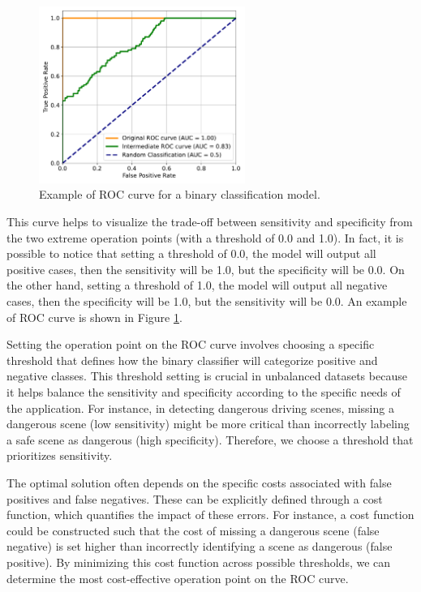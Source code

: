 \begin{figure}
    \centering
    \includegraphics[width=0.6\textwidth]{images/roc/roc_curve.pdf}
    \caption{Example of ROC curve for a binary classification model.}
    \label{fig:roc_curve}
\end{figure}
This curve helps to 
visualize the trade-off between sensitivity and specificity from the two extreme 
operation points (with a threshold of 0.0 and 1.0).
In fact, it is possible to notice that setting a threshold of 0.0, the model 
will output all positive cases, then the sensitivity will be 1.0, but the 
specificity will be 0.0. On the other hand, setting a threshold of 1.0, the model 
will output all negative cases, then the specificity will be 1.0, but the 
sensitivity will be 0.0. An example of ROC curve is shown in Figure 
\ref{fig:roc_curve}.

Setting the operation point on the ROC curve involves choosing a specific 
threshold that defines how the binary classifier will categorize positive and 
negative classes. This threshold setting is crucial in unbalanced datasets 
because it helps balance the sensitivity and specificity according to the 
specific needs of the application. For instance, in detecting dangerous driving 
scenes, missing a dangerous scene (low sensitivity) might be more critical than 
incorrectly labeling a safe scene as dangerous (high specificity). Therefore, 
we choose a threshold that prioritizes sensitivity.

The optimal solution often depends on the specific costs associated with false 
positives and false negatives. These can be explicitly defined through a cost 
function, which quantifies the impact of these errors. For instance, a cost 
function could be constructed such that the cost of missing a dangerous scene 
(false negative) is set higher than incorrectly identifying a scene as dangerous 
(false positive). By minimizing this cost function across possible thresholds, 
we can determine the most cost-effective operation point on the ROC curve.